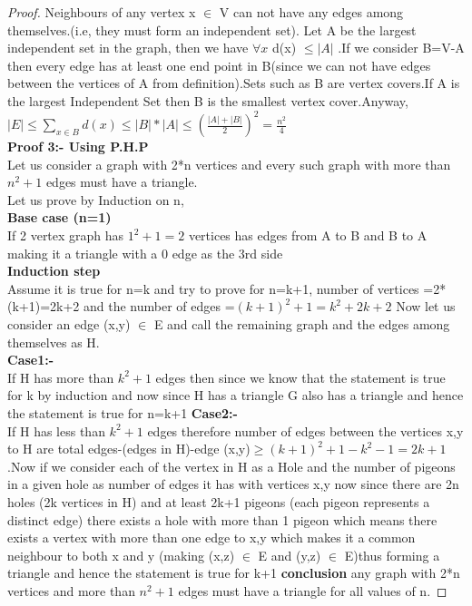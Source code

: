 \begin{proof}
Neighbours of any vertex x $\in$ V can not have any edges among themselves.(i.e, they must form an independent set). Let A be the largest independent set in the graph, then we have $\forall x$
d(x) $\leq |A|$ .If we consider B=V-A then every edge has at least one end point in B(since we can not have edges between the vertices of A from definition).Sets such as B are vertex covers.If A is the largest Independent Set then B is the smallest vertex cover.Anyway, $|E| \leq \sum_{x \in B} d(x) \leq |B|*|A|\leq (\frac{|A|+|B|}{2})^2=\frac{n^2}{4}$\\
\textbf{Proof 3:- Using P.H.P}\\
Let us consider a graph with 2*n vertices and every such graph with more than $n^2+1$ edges must have a triangle.\\
Let us prove by Induction on n,\\
\textbf{Base case (n=1)}\\
If 2 vertex graph has $1^2+1=2$ vertices has edges from A to B and B to A making it a triangle with a 0 edge as the 3rd side\\
\textbf{Induction step}\\
Assume it is true for n=k and try to prove for n=k+1,
number of vertices =2*(k+1)=2k+2 and the number of edges =$(k+1)^2+1=k^2+2k+2$
Now let us consider an edge (x,y) $\in$ E and call the remaining graph and the edges among themselves as H.\\
\textbf{Case1:-}\\
If H has more than $k^2+1$ edges then since we know that the statement is true for k by induction and now since H has a triangle G also has a triangle and hence the statement is true for n=k+1
\textbf{Case2:-}\\
If H has less than $k^2+1 $ edges therefore number of edges between the vertices x,y to H are 
total edges-(edges in H)-edge (x,y)$\geq (k+1)^2+1-k^2-1=2k+1$.Now if we consider each of the vertex in H as a Hole and the number of pigeons in a given hole as number of edges it has with vertices x,y  now since there are 2n holes (2k vertices in H) and at least 2k+1 pigeons (each pigeon represents a distinct edge) there exists a hole with more than 1 pigeon which means there exists a vertex with more than one edge to x,y which makes it a common neighbour to both x and y  (making (x,z) $\in$ E and (y,z) $\in$ E)thus forming a triangle and hence the statement is true for k+1
\textbf{conclusion} any graph with 2*n vertices and more than $n^2+1$ edges must have a triangle for all values of n.
\end{proof}



